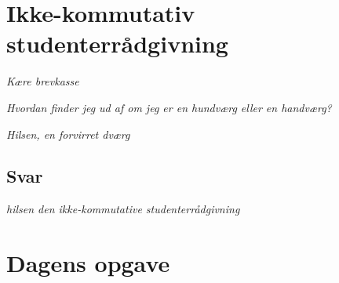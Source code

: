 \begin{minipage}[t]{100mm}
\vspace{1mm}
\section*{Ikke-kommutativ studenterrådgivning}
\emph{Kære brevkasse}

\emph{Hvordan finder jeg ud af om jeg er en hundværg eller en handværg?}

\emph{Hilsen, en forvirret dværg}

\subsection*{Svar}

{\flushright\emph{hilsen den ikke-kommutative studenterrådgivning}}


\vspace{3mm}
\section*{Dagens opgave}

\end{minipage}

